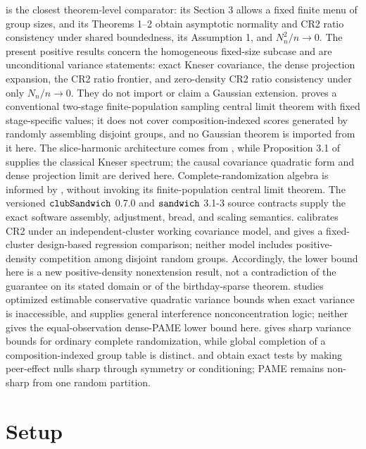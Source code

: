 \documentclass{article}
\begin{document}
\cite{FuSamiiWang2026} is the closest theorem-level comparator: its Section 3 allows a fixed finite menu of group sizes, and its Theorems 1--2 obtain asymptotic normality and CR2 ratio consistency under shared boundedness, its Assumption 1, and \(N_n^2/n\to0\). The present positive results concern the homogeneous fixed-size subcase and are unconditional variance statements: exact Kneser covariance, the dense projection expansion, the CR2 ratio frontier, and zero-density CR2 ratio consistency under only \(N_n/n\to0\). They do not import or claim a Gaussian extension. \cite{Ohlsson1989} proves a conventional two-stage finite-population sampling central limit theorem with fixed stage-specific values; it does not cover composition-indexed scores generated by randomly assembling disjoint groups, and no Gaussian theorem is imported from it here. The slice-harmonic architecture comes from \cite{Filmus2016}, while Proposition 3.1 of \cite{BrouwerEtAl2018} supplies the classical Kneser spectrum; the causal covariance quadratic form and dense projection limit are derived here. Complete-randomization algebra is informed by \cite{LiDing2017}, without invoking its finite-population central limit theorem. The versioned \({\tt clubSandwich}\) 0.7.0 and \({\tt sandwich}\) 3.1-3 source contracts supply the exact software assembly, adjustment, bread, and scaling semantics. \cite{PustejovskyTipton2018} calibrates CR2 under an independent-cluster working covariance model, and \cite{SuDing2021} gives a fixed-cluster design-based regression comparison; neither model includes positive-density competition among disjoint random groups. Accordingly, the lower bound here is a new positive-density nonextension result, not a contradiction of the \cite{PustejovskyTipton2018} guarantee on its stated domain or of the birthday-sparse \cite{FuSamiiWang2026} theorem. \cite{HarshawMiddletonSavje2026} studies optimized estimable conservative quadratic variance bounds when exact variance is inaccessible, and \cite{BasseAiroldi2018} supplies general interference nonconcentration logic; neither gives the equal-observation dense-PAME lower bound here. \cite{AronowGreenLee2014} gives sharp variance bounds for ordinary complete randomization, while global completion of a composition-indexed group table is distinct. \cite{BasseDingFellerToulis2024} and \cite{PuelzBasseFellerToulis2022} obtain exact tests by making peer-effect nulls sharp through symmetry or conditioning; PAME remains non-sharp from one random partition.

\section{Setup}
\end{document}
